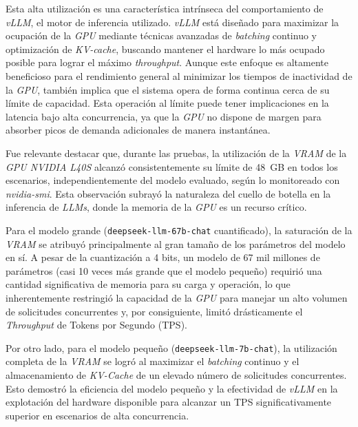 Esta alta utilización es una característica intrínseca del comportamiento de \textit{vLLM}, el motor de inferencia utilizado. \textit{vLLM} está diseñado para maximizar la ocupación de la \textit{GPU} mediante técnicas avanzadas de \textit{batching} continuo y optimización de \textit{KV-cache}, buscando mantener el hardware lo más ocupado posible para lograr el máximo \textit{throughput}. Aunque este enfoque es altamente beneficioso para el rendimiento general al minimizar los tiempos de inactividad de la \textit{GPU}, también implica que el sistema opera de forma continua cerca de su límite de capacidad. Esta operación al límite puede tener implicaciones en la latencia bajo alta concurrencia, ya que la \textit{GPU} no dispone de margen para absorber picos de demanda adicionales de manera instantánea.

Fue relevante destacar que, durante las pruebas, la utilización de la \textit{VRAM} de la \textit{GPU NVIDIA L40S} alcanzó consistentemente su límite de 48~GB en todos los escenarios, independientemente del modelo evaluado, según lo monitoreado con \textit{nvidia-smi}. Esta observación subrayó la naturaleza del cuello de botella en la inferencia de \textit{LLMs}, donde la memoria de la \textit{GPU} es un recurso crítico.

Para el modelo grande (\texttt{deepseek-llm-67b-chat} cuantificado), la saturación de la \textit{VRAM} se atribuyó principalmente al gran tamaño de los parámetros del modelo en sí. A pesar de la cuantización a 4 bits, un modelo de 67 mil millones de parámetros (casi 10 veces más grande que el modelo pequeño) requirió una cantidad significativa de memoria para su carga y operación, lo que inherentemente restringió la capacidad de la \textit{GPU} para manejar un alto volumen de solicitudes concurrentes y, por consiguiente, limitó drásticamente el \textit{Throughput} de Tokens por Segundo (TPS).

Por otro lado, para el modelo pequeño (\texttt{deepseek-llm-7b-chat}), la utilización completa de la \textit{VRAM} se logró al maximizar el \textit{batching} continuo y el almacenamiento de \textit{KV-Cache} de un elevado número de solicitudes concurrentes. Esto demostró la eficiencia del modelo pequeño y la efectividad de \textit{vLLM} en la explotación del hardware disponible para alcanzar un TPS significativamente superior en escenarios de alta concurrencia.


